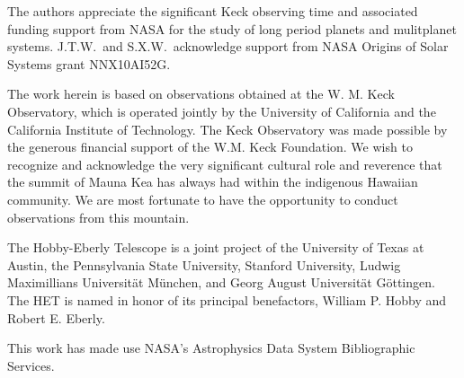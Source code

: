 \documentclass{emulateapj}
\begin{document}
\begin{CJK*}{UTF8}{gbsn}
The authors appreciate the significant Keck observing time and
associated funding support from NASA for the study of long period
planets and mulitplanet systems.
%
J.T.W.\ and S.X.W.\ acknowledge support from NASA Origins of Solar
Systems grant NNX10AI52G.

The work herein is based on observations obtained at the W. M. Keck
Observatory, which is operated jointly by the University of California
and the California Institute of Technology.  The Keck Observatory was
made possible by the generous financial support of the W.M. Keck
Foundation.  We wish to recognize and acknowledge the very significant
cultural role and reverence that the summit of Mauna Kea has always
had within the indigenous Hawaiian community.  We are most fortunate
to have the opportunity to conduct observations from this mountain.

The Hobby-Eberly Telescope is a joint project of the University of
Texas at Austin, the Pennsylvania State University, Stanford
University, Ludwig Maximillians Universit\"at M\"unchen, and Georg
August Universit\"at G\"ottingen. The HET is named in honor of its
principal benefactors, William P. Hobby and Robert E. Eberly.

This work has made use NASA’s Astrophysics Data System Bibliographic Services.


\end{CJK*}


\end{document}
